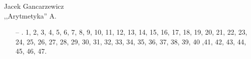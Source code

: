 \documentclass[a4paper,11pt]{article}
\begin{document}
\begin{center}
Jacek Gancarzewicz\\
,,Arytmetyka'' A.
\end{center}
\begin{itemize}
\item[--]. 1, 2, 3, 4, 5, 6, 7, 8, 9, 10, 11, 12, 13, 14, 15, 16, 17, 18, 19, 20, 21, 22, 23, 24, 25, 26, 27, 28, 29, 30, 31, 32, 33, 34, 35, 36, 37, 38, 39, 40 ,41, 42, 43, 44, 45, 46, 47.
\end{itemize}
\end{document}
